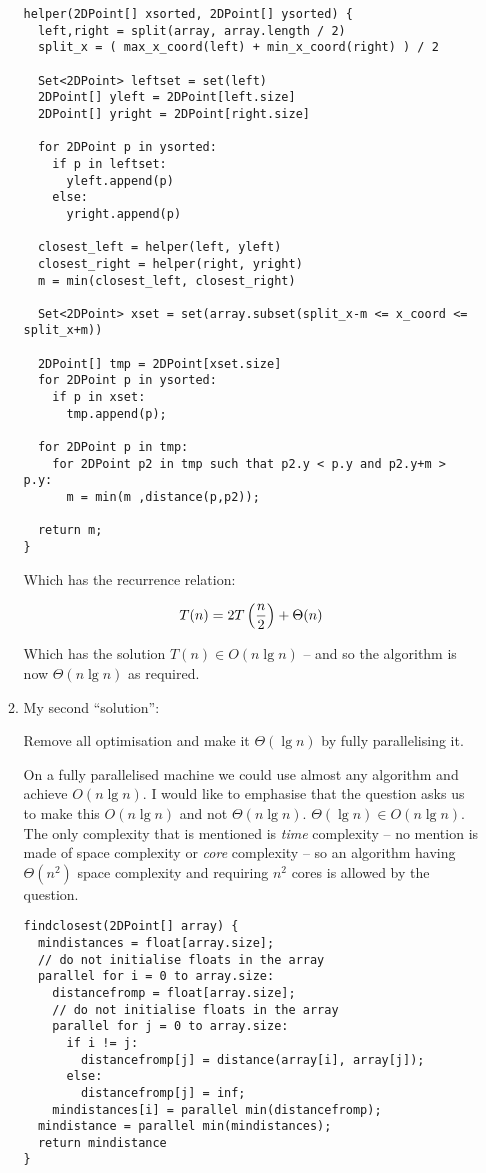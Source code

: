 \documentclass[10pt,\jkfside,a4paper]{article}
\begin{document}
\begin{enumerate}
\begin{enumerate}
\begin{lstlisting}
helper(2DPoint[] xsorted, 2DPoint[] ysorted) {
  left,right = split(array, array.length / 2)
  split_x = ( max_x_coord(left) + min_x_coord(right) ) / 2
  
  Set<2DPoint> leftset = set(left)
  2DPoint[] yleft = 2DPoint[left.size]
  2DPoint[] yright = 2DPoint[right.size]
  
  for 2DPoint p in ysorted:
    if p in leftset:
	  yleft.append(p)
	else:
	  yright.append(p)
  
  closest_left = helper(left, yleft)
  closest_right = helper(right, yright)
  m = min(closest_left, closest_right)
  
  Set<2DPoint> xset = set(array.subset(split_x-m <= x_coord <= split_x+m))
  
  2DPoint[] tmp = 2DPoint[xset.size]
  for 2DPoint p in ysorted:
	if p in xset:
	  tmp.append(p);
  
  for 2DPoint p in tmp:
    for 2DPoint p2 in tmp such that p2.y < p.y and p2.y+m > p.y:
      m = min(m ,distance(p,p2));

  return m;
}
\end{lstlisting}

Which has the recurrence relation:

\begin{equation}
T(n) = 2T\left(\frac{n}{2}\right) + \Theta(n) \\
\end{equation}

Which has the solution $T(n) \in O(n \lg n)$ -- and so the algorithm is now $\Theta(n \lg n)$ 
as required.

\item My second ``solution'':

Remove all optimisation and make it $\Theta(\lg n)$ by fully parallelising it.

On a fully parallelised machine we could use almost any algorithm and achieve 
$O(n\lg n)$. I would like to emphasise that the question asks us to make this 
$O(n \lg n)$ and not $\Theta(n \lg n)$. $\Theta(\lg n) \in O(n \lg n)$. 
The only complexity that is mentioned is \textit{time} complexity -- no mention is 
made of space complexity or \textit{core} complexity -- so an algorithm having 
$\Theta(n^2)$ space complexity and requiring $n^2$ cores is allowed by the question.

\begin{lstlisting}
findclosest(2DPoint[] array) {
  mindistances = float[array.size];
  // do not initialise floats in the array 
  parallel for i = 0 to array.size:
	distancefromp = float[array.size];
	// do not initialise floats in the array
	parallel for j = 0 to array.size:
	  if i != j:
		distancefromp[j] = distance(array[i], array[j]);
	  else:
		distancefromp[j] = inf;
	mindistances[i] = parallel min(distancefromp);
  mindistance = parallel min(mindistances);
  return mindistance
}
\end{lstlisting}


\end{enumerate}
\end{enumerate}
\end{document}
